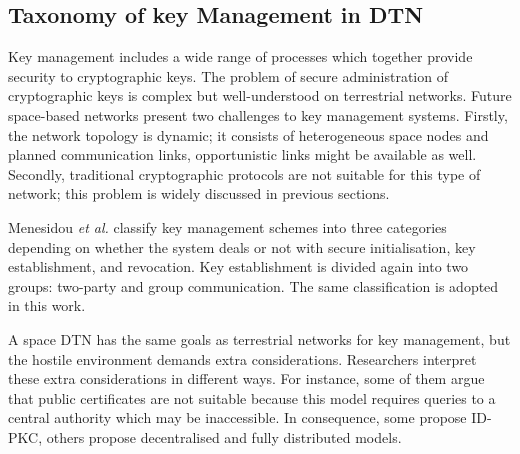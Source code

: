 

  


\subsection{Taxonomy of key Management in DTN}

Key management includes a wide range of processes which together provide security to cryptographic keys.  The problem of secure administration of cryptographic keys is complex but well-understood on terrestrial networks. Future space-based networks present two challenges to key management systems. Firstly, the network topology is dynamic; it consists of heterogeneous space nodes and planned communication links, opportunistic links might be available as well. Secondly, traditional cryptographic protocols are not suitable for this type of network; this problem is widely discussed in previous sections.


Menesidou \textit{et al.} \cite{menesidou2017cryptographic} classify key management schemes into three categories depending on whether the system deals or not with secure initialisation, key establishment, and revocation. Key establishment is divided again into two groups: two-party and group communication. The same classification is adopted in this work. 


A space DTN has the same goals as terrestrial networks for key management, but the hostile environment demands extra considerations. Researchers interpret these extra considerations in different ways. For instance, some of them argue that public certificates are not suitable because this model requires queries to a central authority which may be inaccessible. In consequence, some propose ID-PKC, others propose decentralised and fully distributed models.  

